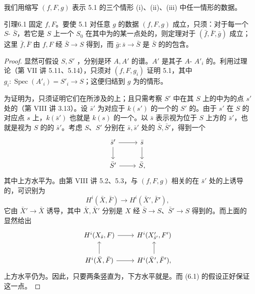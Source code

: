 我们用缩写 $(f,F,g)$ 表示 5.1 的三个情形 (i)、(ii)、(iii) 中任一情形的数据。
\begin{SGAresult}{引理}{6.1}
固定 $f,F$。要使 5.1 对任意 $g$ 的数据 $(f,F,g)$ 成立，只须：对于每一个 $S$- $\bar S$，若它是 $S$ 上一个 $S_0$ 在其中为的某一点处的，则定理对于 $(\bar f,\bar F,\bar g)$ 成立；这里 $\bar f,\bar F$ 由 $f,F$ 经 $\bar S\to S$ 得到，而 $\bar g:\bar s\to\bar S$ 是 $\bar S$ 的的包含。
\end{SGAresult}
\begin{proof}
显然可假设 $S,S'$ ，分别是环 $A,A'$ 的谱。$A'$ 是其子 $A$- $A'_i$ 的。利用过理论（第 VII 讲 5.11、5.14），只须对 $(f,F,g_i)$ 证明 5.1，其中 $g_i:\operatorname{Spec}(A'_i)=S'_i\to S$；这便归结到 $g$ 为的情形。

为证明为，只须证明它们在所涉及的上；且只需考察 $S'$ 中在其 $S$ 上的中为的点 $s'$ 处的（第 VIII 讲 3.13）。设 $\bar s'$ 为对应于 $k(s')$ 的一个的 $S'$ 的。由于 $s'$ 在 $S$ 的对应点 $s$ 上，$k(\bar s')$ 也就是 $k(s)$ 的一个。以 $\bar s$ 表示视为位于 $S$ 上方的 $\bar s'$，也就是视为 $S$ 的的 $\bar s'$。考虑 $S$、$S'$ 分别在 $\bar s,\bar s'$ 处的 $\bar S,\bar S'$，得到一个
\[
\begin{tikzcd}
\bar s'\arrow[r]\arrow[d]&\bar s\arrow[d]\\
\bar S'\arrow[r]&\bar S,
\end{tikzcd}
\]
其中上方水平为。由第 VIII 讲 5.2、5.3，与 $(f,F,g)$ 相关的在 $\bar s'$ 处的上诱导的，可识别为
\[
H^i(\bar X,\bar F)\longrightarrow H^i(\bar X',\bar F'),
\]
它由 $\bar X'\to\bar X$ 诱导，其中 $\bar X,\bar X'$ 分别是 $X$ 经 $\bar S\to S$、$\bar S'\to S$ 得到的。而上面的显然给出
\[
\begin{tikzcd}
H^i(X_{\bar s},F)\arrow[r]&H^i(X'_{\bar s'},F')\\
H^i(\bar X,\bar F)\arrow[r]\arrow[u]&H^i(\bar X',\bar F')\arrow[u],
\end{tikzcd}
\]
上方水平仍为。因此，只要两条竖直为，下方水平就是。而 (6.1) 的假设正好保证这一点。
\end{proof}


